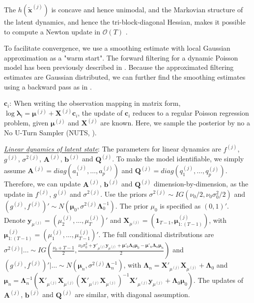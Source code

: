 \documentclass{article}
\begin{document}
	The $h(\bm{\widetilde{x}}^{(j)})$ is concave and hence unimodal, and the Markovian structure of the latent dynamics, and hence the tri-block-diagonal Hessian, makes it possible to compute a Newton update in $\mathcal{O}(T)$ \citep{Paninski2010}.
	
	To facilitate convergence, we use a smoothing estimate with local Gaussian approximation as a "warm start". The forward filtering for a dynamic Poisson model has been previously described in \cite{Eden2004}. Because the approximated filtering estimates are Gaussian distributed, we can further find the smoothing estimates using a backward pass as in \cite{RAUCH1965}.
	
	\underline{\textit{$\bm{c}_i$}}: 
	When writing the observation mapping in matrix form,
	$\log\bm{\lambda}_i = \bm{\mu}^{(j)}+ \bm{X}^{(j)}\bm{c}_i$, the update of $\bm{c}_i$ reduces to a regular Poisson regression problem, given $\bm{\mu}^{(j)}$ and $\bm{X}^{(j)}$ are known. Here, we sample the posterior by no a No U-Turn Sampler (NUTS, \cite{Hoffman2011}).
	
	\underline{\textit{Linear dynamics of latent state}}: The parameters for linear dynamics are $f^{(j)}$, $g^{(j)}$, $\sigma^{2(j)}$, $\bm{A}^{(j)}$, $\bm{b}^{(j)}$ and $\bm{Q}^{(j)}$. To make the model identifiable, we simply assume $\bm{A}^{(j)} = diag(a_1^{(j)},\ldots, a_p^{(j)})$ and $\bm{Q}^{(j)} = diag(q_1^{(j)},\ldots, q_p^{(j)})$. Therefore, we can update $\bm{A}^{(j)}$, $\bm{b}^{(j)}$ and $\bm{Q}^{(j)}$ dimension-by-dimension, as the update in $f^{(j)}$, $g^{(j)}$ and $\sigma^{2(j)}$. Use the priors $\sigma^{2(j)} \sim IG\left(\nu_0/2, \nu_0\sigma_0^2/2\right)$ and  $\left( g^{(j)}, f^{(j)}\right)'\sim N(\bm{\mu}_0, \sigma^{2(j)}\bm{\Lambda}_0^{-1})$. The prior $\mu_0$ is specified as $(0,1)'$. Denote $\bm{y}_{\mu^{(j)}} = \left(\mu_2^{(j)}, \ldots, \mu_T^{(j)}\right)'$ and $\bm{X}_{\mu^{(j)}} = \left(\bm{1}_{T-1}, \bm{\mu}_{1:(T-1)}^{(j)}\right)$, with $\bm{\mu}_{1:(T-1)}^{(j)} = \left(\mu_1^{(j)}, \ldots, \mu_{T-1}^{(j)}\right)'$. The full conditional distributions are $\sigma^{2(j)}|\ldots \sim IG\left(\frac{\nu_0 + T-1}{2}, \frac{\nu_0\sigma^2_0 + \bm{y}'_{\mu^{(j)}}\bm{y}_{\mu^{(j)}} + \bm{\mu}'_0\bm{\Lambda}_0\bm{\mu}_0 - \bm{\mu}'_n\bm{\Lambda}_n\bm{\mu}_n }{2}\right)$ and $\left( g^{(j)}, f^{(j)}\right)'|\ldots \sim N(\bm{\mu}_n, \sigma^{2(j)}\bm{\Lambda}_n^{-1})$, with $\bm{\Lambda}_n = \bm{X}'_{\mu^{(j)}}\bm{X}_{\mu^{(j)}} + \bm{\Lambda}_0$ and $\bm{\mu}_n = \bm{\Lambda}_n^{-1}\left(\bm{X}'_{\mu^{(j)}}\bm{X}_{\mu^{(j)}}\left(\bm{X}'_{\mu^{(j)}}\bm{X}_{\mu^{(j)}}\right)^{-1}\bm{X}'_{\mu^{(j)}}\bm{y}_{\mu^{(j)}} + \bm{\Lambda}_0\bm{\mu}_0\right)$. The updates of $\bm{A}^{(j)}$, $\bm{b}^{(j)}$ and $\bm{Q}^{(j)}$ are similar, with diagonal assumption.
	
	
	
	
	
	
	
	
	
	
	
	
\end{document}
